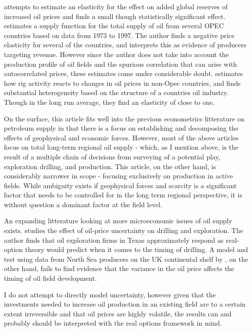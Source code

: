 \documentclass[12pt]{article}
\begin{document}
\citet{farzin_impact_2001} attempts to estimate an elasticity for the effect on added global reserves of increased oil prices and finds a small though statistically significant effect.  \citet{ramcharran_oil_2002} estimates a supply function for the total supply of oil from several OPEC countries based on data from 1973 to 1997.  The author finds a negative price elasticity for several of the countries, and interprets this as evidence of producers targeting revenue.  However since the author does not take into account the production profile of oil fields and the spurious correlation that can arise with autocorrelated prices, these estimates come under considerable doubt. \citet{ringlund_does_2008} estimates how rig activity reacts to changes in oil prices in non-Opec countries, and finds substantial heterogeneity based on the structure of a countries oil industry. Though in the long run average, they find an elasticity of close to one. 

On the surface, this article fits well into the previous econometrics litterature on petroleum supply in that there is a focus on establishing and decomposing the effects of geophysical and economic forces. However, most of the above articles focus on total long-term regional oil supply - which, as I mention above, is the result of a multiple chain of decisions from surveying of a potential play, exploration drilling, and production. This article, on the other hand, is considerably narrower in scope - focusing exclusively on production in active fields. While ambiguity exists if geophysical forces and scarcity is a significant factor that needs to be controlled for in the long term regional perspective, it is without question a dominant factor at the field level.

An expanding litterature looking at more microeconomic issues of oil supply exists. \citet{kellogg_effect_2014} studies the effect of oil-price uncertainty on drilling and exploration. The author finds that oil exploration firms in Texas approximately respond as real-option theory would predict when it comes to the timing of drilling.  A model and test using data from North Sea producers on the UK continental shelf by \citet{hurn_geology_1994}, on the other hand, fails to find evidence that the variance in the oil price affects the timing of oil field development.  

I do not attempt to directly model uncertainty, however given that the investments needed to increase oil production in an existing field are to a certain extent irreversible and that oil prices are highly volatile, the results can and probably should be interpreted with the real options framework in mind.  
\end{document}
